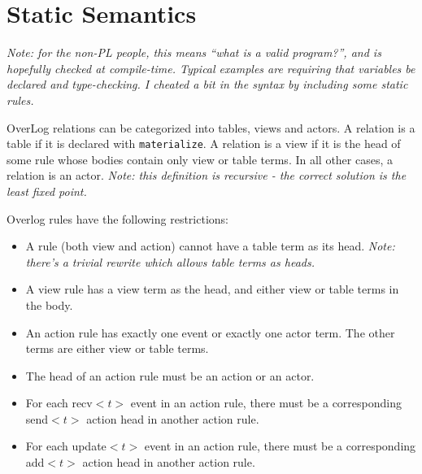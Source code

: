 \documentclass{article}
\newcommand{\code}[1]{{\tt \small #1}}
\begin{document}

\section{Static Semantics}

\emph{Note: for the non-PL people, this means ``what is a valid program?'',
and is hopefully checked at compile-time. Typical examples are requiring
that variables be declared and type-checking. I cheated a bit in the 
syntax by including some static rules.}

OverLog relations can be categorized into tables, views and actors. A
relation is a table if it is declared with \code{materialize}. A relation
is a view if it is the head of some rule whose bodies contain only view
or table terms. In all other cases, a relation is an actor. \emph{Note:
this definition is recursive - the correct solution is the least fixed
point.}


Overlog rules have the following restrictions:

\begin{itemize}

\item A rule (both view and action) cannot have a table term as its head. \emph{Note:
there's a trivial rewrite which allows table terms as heads.} 

\item A view rule has a view term as the head, and either view or table
  terms in the body.

\item An action rule has exactly one event or exactly one actor term. The other
  terms are either view or table terms.

\item The head of an action rule must be an action or an actor.

\item For each recv$<t>$ event in an action rule, there must be a
  corresponding send$<t>$ action head in another action rule.

\item For each update$<t>$ event in an action rule, there must be a
  corresponding add$<t>$ action head in another action rule.

\end{itemize}
\end{document}
